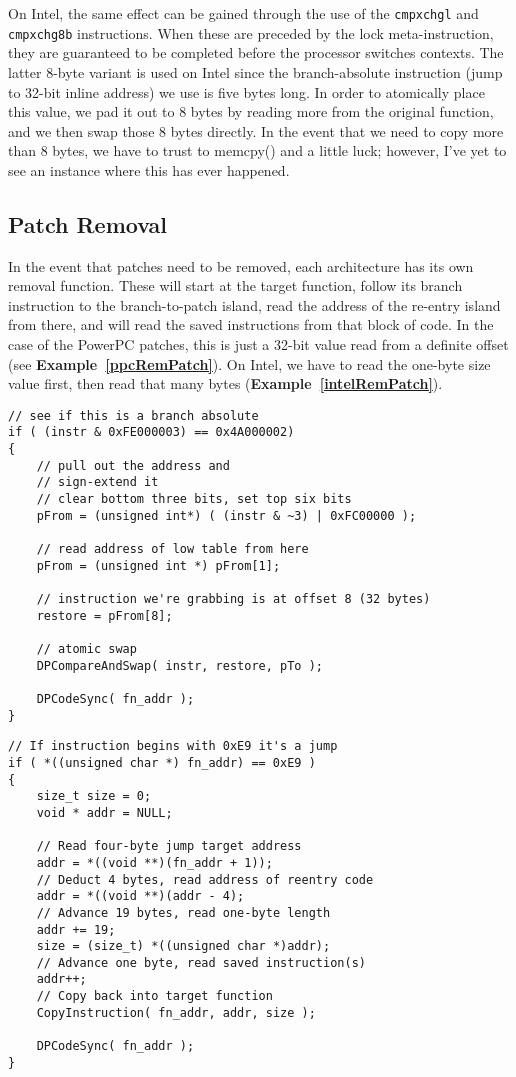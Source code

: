 \documentclass[english]{article}
\begin{document}
On Intel, the same effect can be gained through the use of the \texttt{cmpxchgl} and \texttt{cmpxchg8b} instructions. When these are preceded by the lock meta-instruction, they are guaranteed to be completed before the processor switches contexts. The latter 8-byte variant is used on Intel since the branch-absolute instruction (jump to 32-bit inline address) we use is five bytes long. In order to atomically place this value, we pad it out to 8 bytes by reading more from the original function, and we then swap those 8 bytes directly. In the event that we need to copy more than 8 bytes, we have to trust to memcpy() and a little luck; however, I've yet to see an instance where this has ever happened.

\subsection{Patch Removal}
In the event that patches need to be removed, each architecture has its own removal function. These will start at the target function, follow its branch instruction to the branch-to-patch island, read the address of the re-entry island from there, and will read the saved instructions from that block of code. In the case of the PowerPC patches, this is just a 32-bit value read from a definite offset (see \textbf{Example~\ref{ppcRemPatch}}). On Intel, we have to read the one-byte size value first, then read that many bytes (\textbf{Example~\ref{intelRemPatch}}).

\begin{lstlisting}[label=ppcRemPatch, caption=PowerPC patch removal algorithm.]
// see if this is a branch absolute
if ( (instr & 0xFE000003) == 0x4A000002)
{
    // pull out the address and
    // sign-extend it
    // clear bottom three bits, set top six bits
    pFrom = (unsigned int*) ( (instr & ~3) | 0xFC00000 );

    // read address of low table from here
    pFrom = (unsigned int *) pFrom[1];

    // instruction we're grabbing is at offset 8 (32 bytes)
    restore = pFrom[8];

    // atomic swap
    DPCompareAndSwap( instr, restore, pTo );

    DPCodeSync( fn_addr );
}
\end{lstlisting}

\begin{lstlisting}[label= intelRemPatch, caption=Intel patch removal algorithm.]
// If instruction begins with 0xE9 it's a jump
if ( *((unsigned char *) fn_addr) == 0xE9 )
{
    size_t size = 0;
    void * addr = NULL;

    // Read four-byte jump target address
    addr = *((void **)(fn_addr + 1));
    // Deduct 4 bytes, read address of reentry code
    addr = *((void **)(addr - 4);
    // Advance 19 bytes, read one-byte length
    addr += 19;
    size = (size_t) *((unsigned char *)addr);
    // Advance one byte, read saved instruction(s)
    addr++;
    // Copy back into target function
    CopyInstruction( fn_addr, addr, size );

    DPCodeSync( fn_addr );
}
\end{lstlisting}
\end{document}
